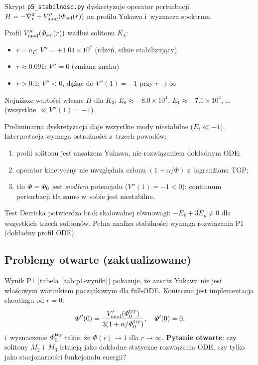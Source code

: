 Skrypt \texttt{p5\_stabilnosc.py} dyskretyzuje operator perturbacji
$H = -\nabla^2_r + V''_{\rm mod}(\Phi_{\rm sol}(r))$
na profilu Yukawa i~wyznacza spektrum.

Profil $V''_{\rm mod}(\Phi_{\rm sol}(r))$ wzdłuż solitonu $K_3$:
\begin{itemize}[nosep]
\item $r = a_\Gamma$: $V'' = +1.04 \times 10^7$ (rdzeń, silnie stabilizujący)
\item $r \approx 0.091$: $V'' = 0$ (zmiana znaku)
\item $r > 0.1$: $V'' < 0$, dążąc do $V''(1) = -1$ przy $r \to \infty$
\end{itemize}

Najniższe wartości własne $H$ dla $K_3$:
$E_0 \approx -8.0 \times 10^4$, $E_1 \approx -7.1\times10^4$, \ldots
(wszystkie $\ll V''(1) = -1$).

\begin{result}%
\label{res:p5}
Preliminarna dyskretyzacja daje wszystkie mody niestabilne
($E_i \ll -1$). Interpretacja wymaga ostrożności z~trzech powodów:
\begin{enumerate}[nosep,label=(\roman*)]
\item profil solitonu jest ansatzem Yukawa, nie rozwiązaniem dokładnym ODE;
\item operator kinetyczny nie uwzględnia członu $(1 + \alpha/\Phi)$ z~lagranżianu TGP;
\item tło $\Phi = \PhiZero$ jest \emph{siodłem} potencjału ($V''(1) = -1 < 0$):
      continuum perturbacji tła samo w~sobie jest niestabilne.
\end{enumerate}
Test Derricka potwierdza brak skalowalnej równowagi:
$-E_k + 3E_p \neq 0$ dla wszystkich trzech solitonów.
Pełna analiza stabilności wymaga rozwiązania P1 (dokładny profil ODE).
\end{result}

\subsection{Problemy otwarte (zaktualizowane)}%
\label{app:I-otwarte}

\begin{problem}[Shooting od $r=0$: właściwe równanie ODE dla solitonów]%
\label{prob:ODE}
Wynik P1 (tabela~\ref{tab:p1-wyniki}) pokazuje, że ansatz Yukawa
nie jest właściwym warunkiem początkowym dla full-ODE.
Konieczna jest implementacja shootingu od $r = 0$:
\begin{equation}
    \Phi''(0) = \frac{V'_{\rm mod}(\Phi_0^{\rm try})}{3(1 + \alpha/\Phi_0^{\rm try})},
    \quad \Phi'(0) = 0,
\end{equation}
i~wyznaczenie $\Phi_0^{\rm try}$ takie, że $\Phi(r) \to 1$ dla $r \to \infty$.
\textbf{Pytanie otwarte}: czy solitony $M_2$ i~$M_3$ istnieją jako
dokładne statyczne rozwiązania ODE, czy tylko jako stacjonarności funkcjonału energii?
\end{problem}

